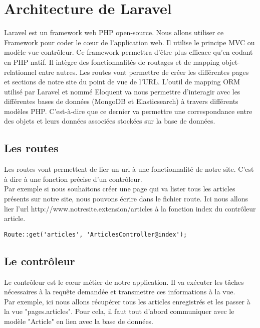 \newpage
\section{Architecture de Laravel}
\label{sec:laravel}

Laravel est un framework web PHP open-source. Nous allons utiliser ce Framework pour coder le cœur de l'application web. Il utilise le principe MVC ou modèle-vue-contrôleur. Ce framework permettra d'être plus efficace qu'en codant en PHP natif. Il intègre des fonctionnalités de routages et de mapping objet-relationnel entre autres. Les routes vont permettre de créer les différentes pages et sections de notre site du point de vue de l'URL. L'outil de mapping ORM utilisé par Laravel et nommé Eloquent va nous permettre d'interagir avec les différentes bases de données (MongoDB et Elasticsearch) à travers différents modèles PHP. C'est-à-dire que ce dernier va permettre une correspondance entre des objets et leurs données associées stockées sur la base de données.

\subsection{Les routes}

Les routes vont permettent de lier un url à une fonctionnalité de notre site. C'est à dire à une fonction précise d'un contrôleur.\\
Par exemple si nous souhaitons créer une page qui va lister tous les articles présents sur notre site, nous pouvons écrire dans le fichier route. Ici nous allons lier l'url http://www.notresite.extension/articles à la fonction index du contrôleur article.

\begin{verbatim}
Route::get('articles', 'ArticlesController@index');
\end{verbatim}

\subsection{Le contrôleur}

Le contrôleur est le cœur métier de notre application. Il va exécuter les tâches nécessaires à la requête demandée et transmettre ces informations à la vue.\\
Par exemple, ici nous allons récupérer tous les articles enregistrés et les passer à la vue "pages.articles". Pour cela, il faut tout d'abord communiquer avec le modèle "Article" en lien avec la base de données.

